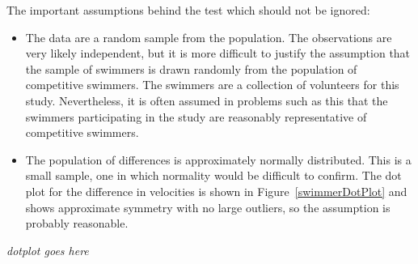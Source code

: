The important assumptions behind the test which should not be ignored:
\begin{itemize}
	
	\item  The data are a random sample from the population.  The observations are very likely independent, but it is more difficult to justify the assumption that the sample of swimmers is drawn randomly from the population of competitive swimmers.  The swimmers are a collection of volunteers for this study.  Nevertheless, it is often assumed in problems such as this that the swimmers participating in the study are reasonably representative of competitive swimmers.
	
	\item The population of differences is approximately normally distributed.  This is a small sample, one in which normality would be difficult to confirm.  The dot plot for the difference in velocities is shown in Figure~\ref{swimmerDotPlot} and shows approximate symmetry with no large outliers, so the assumption is probably reasonable.
	
\end{itemize}	

\textit{dotplot goes here}

